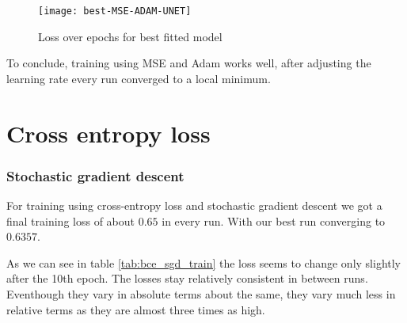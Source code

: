 \begin{figure}[h]
    \texttt{[image: best-MSE-ADAM-UNET]}
    \caption{\label{im:best-MSE-ADAM-UNET} Loss over epochs for best fitted model}
\end{figure}

To conclude, training using MSE and Adam works well, after adjusting the learning rate every run converged
to a local minimum.

\section{Cross entropy loss}
\subsubsection{Stochastic gradient descent}
 For training using cross-entropy loss and stochastic gradient descent we got a final training loss
 of about $0.65$ in every run. With our best run converging to $0.6357$.

 As we can see in table \ref{tab:bce_sgd_train} the loss seems to change only slightly after the 10th epoch.
 The losses stay relatively consistent in between runs. Eventhough they vary in absolute terms about the same,
 they vary much less in relative terms as they are almost three times as high.



